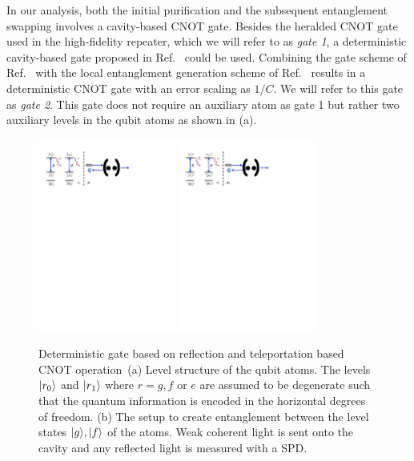 In our analysis, both the initial purification and the subsequent entanglement
swapping involves a cavity-based CNOT gate. Besides the heralded CNOT gate used
in the high-fidelity repeater, which we will refer to as \emph{gate 1}, a
deterministic cavity-based gate proposed in Ref.~\cite{Anders2prl} could be
used. Combining the gate scheme of Ref.~\cite{Anders2prl} with the local
entanglement generation scheme of Ref.~\cite{Anders1prl} results in a
deterministic CNOT gate with an error scaling as $1/C$.  We will refer to this
gate as \emph{gate 2}. This gate does not require an auxiliary atom as gate 1
but rather two auxiliary levels in the qubit atoms as shown in
(a).
\begin{figure}
\centering
\includegraphics[width=0.4\textwidth]{./figs_Borregaard_PRA2015/figure4a}
\includegraphics[width=0.4\textwidth]{./figs_Borregaard_PRA2015/figure4b}
\caption[CNOT gate structure]
{Deterministic gate based on reflection and
teleportation based CNOT operation~\cite{Anders1prl,Anders2prl}(a) Level
structure of the qubit atoms. The levels $| r_{0} \rangle$ and $| r_{1} \rangle$ where
$r=g,f$ or $e$ are assumed to be degenerate such that the quantum information is
encoded in the horizontal degrees of freedom. (b) The setup to create
entanglement between the level states $| g \rangle,| f \rangle$ of the atoms. Weak
coherent light is sent onto the cavity and any reflected light is measured with
a SPD. }
\label{fig:figure4}
\end{figure}
